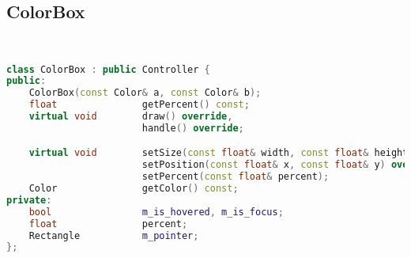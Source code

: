\subsection{ColorBox}
\begin{lstlisting}[language=C++]


class ColorBox : public Controller {
public:
    ColorBox(const Color& a, const Color& b);
    float               getPercent() const;
    virtual void        draw() override,
                        handle() override;

    virtual void        setSize(const float& width, const float& height) override,
                        setPosition(const float& x, const float& y) override,
                        setPercent(const float& percent);
    Color               getColor() const;
private:
    bool                m_is_hovered, m_is_focus;
    float               percent;
    Rectangle           m_pointer;
};






\end{lstlisting}
